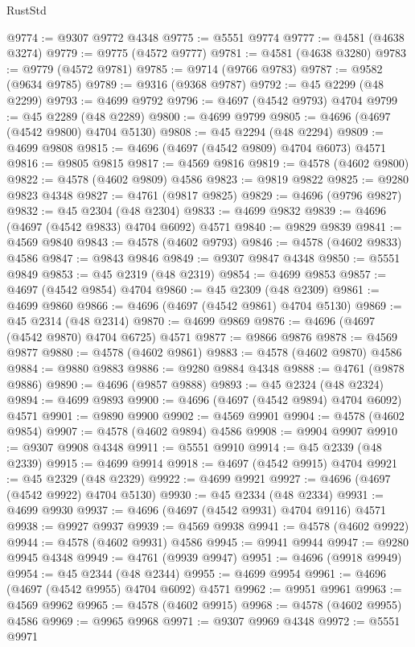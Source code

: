 \begin{lexlean}{RustStd}
\begin{coremodule}
@9774 := @9307 @9772 @4348
@9775 := @5551 @9774
@9777 := @4581 (@4638 @3274)
@9779 := @9775 (@4572 @9777)
@9781 := @4581 (@4638 @3280)
@9783 := @9779 (@4572 @9781)
@9785 := @9714 (@9766 @9783)
@9787 := @9582 (@9634 @9785)
@9789 := @9316 (@9368 @9787)
@9792 := @45 @2299 (@48 @2299)
@9793 := @4699 @9792
@9796 := @4697 (@4542 @9793) @4704
@9799 := @45 @2289 (@48 @2289)
@9800 := @4699 @9799
@9805 := @4696 (@4697 (@4542 @9800) @4704 @5130)
@9808 := @45 @2294 (@48 @2294)
@9809 := @4699 @9808
@9815 := @4696 (@4697 (@4542 @9809) @4704 @6073) @4571
@9816 := @9805 @9815
@9817 := @4569 @9816
@9819 := @4578 (@4602 @9800)
@9822 := @4578 (@4602 @9809) @4586
@9823 := @9819 @9822
@9825 := @9280 @9823 @4348
@9827 := @4761 (@9817 @9825)
@9829 := @4696 (@9796 @9827)
@9832 := @45 @2304 (@48 @2304)
@9833 := @4699 @9832
@9839 := @4696 (@4697 (@4542 @9833) @4704 @6092) @4571
@9840 := @9829 @9839
@9841 := @4569 @9840
@9843 := @4578 (@4602 @9793)
@9846 := @4578 (@4602 @9833) @4586
@9847 := @9843 @9846
@9849 := @9307 @9847 @4348
@9850 := @5551 @9849
@9853 := @45 @2319 (@48 @2319)
@9854 := @4699 @9853
@9857 := @4697 (@4542 @9854) @4704
@9860 := @45 @2309 (@48 @2309)
@9861 := @4699 @9860
@9866 := @4696 (@4697 (@4542 @9861) @4704 @5130)
@9869 := @45 @2314 (@48 @2314)
@9870 := @4699 @9869
@9876 := @4696 (@4697 (@4542 @9870) @4704 @6725) @4571
@9877 := @9866 @9876
@9878 := @4569 @9877
@9880 := @4578 (@4602 @9861)
@9883 := @4578 (@4602 @9870) @4586
@9884 := @9880 @9883
@9886 := @9280 @9884 @4348
@9888 := @4761 (@9878 @9886)
@9890 := @4696 (@9857 @9888)
@9893 := @45 @2324 (@48 @2324)
@9894 := @4699 @9893
@9900 := @4696 (@4697 (@4542 @9894) @4704 @6092) @4571
@9901 := @9890 @9900
@9902 := @4569 @9901
@9904 := @4578 (@4602 @9854)
@9907 := @4578 (@4602 @9894) @4586
@9908 := @9904 @9907
@9910 := @9307 @9908 @4348
@9911 := @5551 @9910
@9914 := @45 @2339 (@48 @2339)
@9915 := @4699 @9914
@9918 := @4697 (@4542 @9915) @4704
@9921 := @45 @2329 (@48 @2329)
@9922 := @4699 @9921
@9927 := @4696 (@4697 (@4542 @9922) @4704 @5130)
@9930 := @45 @2334 (@48 @2334)
@9931 := @4699 @9930
@9937 := @4696 (@4697 (@4542 @9931) @4704 @9116) @4571
@9938 := @9927 @9937
@9939 := @4569 @9938
@9941 := @4578 (@4602 @9922)
@9944 := @4578 (@4602 @9931) @4586
@9945 := @9941 @9944
@9947 := @9280 @9945 @4348
@9949 := @4761 (@9939 @9947)
@9951 := @4696 (@9918 @9949)
@9954 := @45 @2344 (@48 @2344)
@9955 := @4699 @9954
@9961 := @4696 (@4697 (@4542 @9955) @4704 @6092) @4571
@9962 := @9951 @9961
@9963 := @4569 @9962
@9965 := @4578 (@4602 @9915)
@9968 := @4578 (@4602 @9955) @4586
@9969 := @9965 @9968
@9971 := @9307 @9969 @4348
@9972 := @5551 @9971

\end{coremodule}
\end{lexlean}
